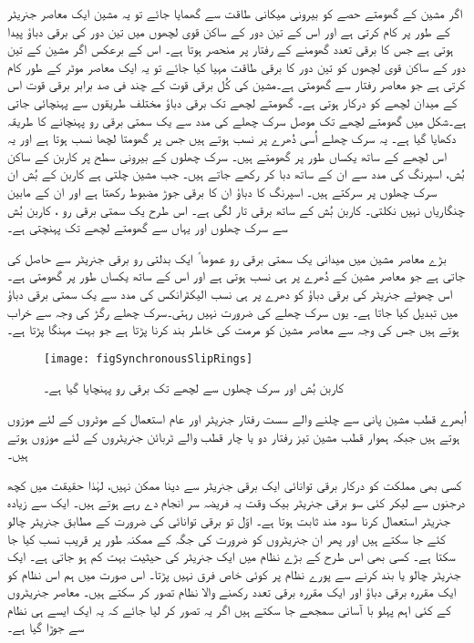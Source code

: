 اگر مشین کے گھومتے حصے کو بیرونی میکانی طاقت سے گھمایا جائے تو یہ مشین ایک معاصر جنریٹر کے طور پر کام کرتی ہے اور اس کے تین دور کے ساکن قوی لچھوں میں تین دور کی برقی دباؤ پیدا ہوتی ہے جس کا برقی تعدد گھومنے کے رفتار پر منحصر ہوتا ہے۔ اس کے برعکس اگر مشین کے تین دور کے ساکن قوی لچھوں کو تین دور کا برقی طاقت مہیا کیا جائے تو یہ ایک معاصر موٹر کے طور کام کرتی ہے جو معاصر رفتار سے گھومتی ہے۔مشین کی کُل برقی قوت کے چند فی صد  برابر برقی قوت اس کے میدان لچھے کو درکار ہوتی ہے۔ گھومتے لچھے تک برقی دباؤ مختلف طریقوں سے پہنچائی جاتی ہے۔شکل   میں گھومتے لچھے تک موصل سرک چھلے  کی مدد سے یک سمتی برقی رو پہنچانے کا طریقہ دکھایا گیا ہے۔ یہ سرک چھلے اُسی دُھرے  پر نسب ہوتے ہیں جس پر گھومتا لچھا نسب ہوتا ہے اور یہ اس لچھے کے ساتھ یکساں طور پر گھومتے ہیں۔ سرک چھلوں  کے بیرونی سطح پر کاربن کے ساکن بُش، اسپرنگ  کی مدد سے ان کے ساتھ دبا کر رکھے جاتے ہیں۔ جب مشین چلتی ہے  کاربن کے بُش ان سرک چھلوں پر سرکتے ہیں۔ اسپرنگ کا دباؤ ان کا برقی جوڑ مضبوط رکھتا ہے اور ان کے مابین چنگاریاں نہیں نکلتی۔ کاربن بُش کے ساتھ برقی تار لگی ہے۔ اس طرح یک سمتی برقی رو  ، کاربن بُش سے سرک چھلوں اور یہاں سے گھومتے لچھے تک پہنچتی ہے۔

بڑے معاصر مشین میں میدانی یک سمتی برقی رو عموما ً ایک بدلتی رو برقی جنریٹر سے حاصل کی جاتی ہے جو معاصر مشین کے دُھرے پر ہی نسب ہوتی ہے اور اس کے ساتھ یکساں طور پر گھومتی ہے۔اس چھوٹے جنریٹر کی برقی دباؤ کو دھرے پر ہی نسب الیکٹرانکس کی مدد سے یک سمتی برقی دباؤ میں تبدیل کیا جاتا ہے۔ یوں سرک چھلے کی ضرورت نہیں رہتی۔سرک چھلے رگڑ کی وجہ سے خراب ہوتے ہیں جس کی وجہ سے معاصر مشین کو مرمت کی خاطر بند کرنا پڑتا ہے جو بہت مہنگا پڑتا ہے۔
\begin{figure}
\centering
\texttt{[image: figSynchronousSlipRings]}
\caption{کاربن بُش اور سرک چھلوں سے لچھے تک برقی رو پہنچایا گیا ہے۔}
\label{شکل_معاصر_سرک_چھلے}
\end{figure}

اُبھرے قطب مشین پانی سے چلنے والے سست رفتار جنریٹر اور  عام استعمال کے موٹروں کے لئے موزوں ہوتے ہیں جبکہ ہموار قطب مشین تیز رفتار دو یا چار قطب والے ٹربائن جنریٹروں کے لئے موزوں ہوتے ہیں۔

کسی بھی مملکت کو درکار برقی توانائی ایک برقی جنریٹر سے دینا ممکن نہیں، لہٰذا حقیقت میں کچھ درجنوں سے لیکر کئی سو برقی جنریٹر بیک وقت یہ فریضہ سر انجام دے رہے ہوتے ہیں۔ ایک سے زیادہ جنریٹر استعمال کرنا سود مند ثابت ہوتا ہے۔ اوّل تو برقی توانائی کی ضرورت کے مطابق جنریٹر چالو کئے جا سکتے ہیں اور پھر ان جنریٹروں کو ضرورت کی جگہ کے ممکنہ طور پر قریب نسب کیا جا سکتا ہے۔ کسی بھی اس طرح کے بڑے نظام میں ایک جنریٹر کی حیثیت بہت کم ہو جاتی ہے۔ ایک جنریٹر چالو یا بند کرنے سے پورے نظام پر کوئی خاص فرق نہیں پڑتا۔ اس صورت میں ہم اس نظام کو ایک مقررہ برقی دباؤ اور ایک مقررہ برقی تعدد رکھنے والا نظام تصور کر سکتے ہیں۔ معاصر جنریٹروں کے کئی اہم پہلو با آسانی سمجھے جا سکتے ہیں اگر یہ تصور کر لیا جائے کہ یہ ایک ایسے ہی نظام سے جوڑا گیا ہے۔

